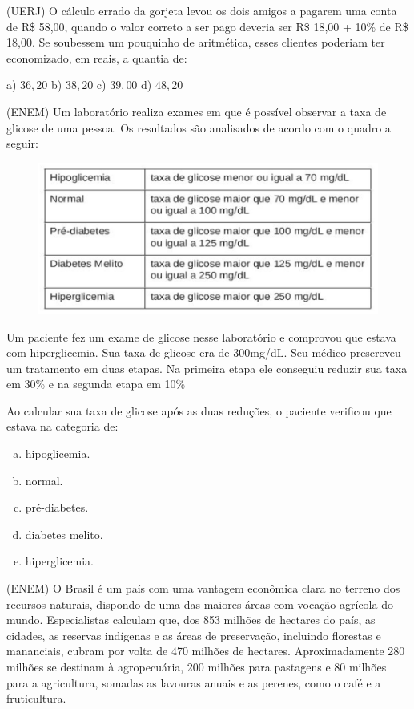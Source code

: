\begin{multicols*}{2}
	\execnum (UERJ) O cálculo errado da gorjeta levou os dois amigos a pagarem uma conta de R\$ 58,00, quando o valor correto a ser pago deveria ser R\$ 18,00 + 10\% de R\$ 18,00. Se soubessem um pouquinho de aritmética, esses clientes
	poderiam ter economizado, em reais, a quantia de:

	a) $36,20 $ b) $38,20 $ c) $39,00 $ d) $48,20 $

	\execnum (ENEM) Um laboratório realiza exames em que é possível observar a taxa de glicose de uma pessoa. Os
	resultados são analisados de acordo com o quadro a seguir:

	\begin{figure}[H]
		\centering
		\includegraphics[width=\columnwidth]{assets/glicemia.png}
	\end{figure}

	Um paciente fez um exame de glicose nesse laboratório e comprovou que estava com hiperglicemia. Sua taxa de
	glicose era de 300mg/dL. Seu médico prescreveu um tratamento em duas etapas. Na primeira etapa ele
	conseguiu reduzir sua taxa em 30\% e na segunda etapa em 10\%

	Ao calcular sua taxa de glicose após as duas reduções, o paciente verificou que estava na categoria de:
	\begin{enumerate}[(a)]
		\item hipoglicemia.
		\item normal.
		\item pré-diabetes.
		\item diabetes melito.
		\item hiperglicemia.
	\end{enumerate}


	\execnum (ENEM) O Brasil é um país com uma vantagem econômica clara no terreno dos recursos naturais, dispondo de uma das maiores áreas com vocação agrícola do mundo. Especialistas calculam que, dos 853 milhões de hectares do país, as cidades, as reservas indígenas e as áreas de preservação, incluindo florestas e mananciais, cubram por volta de 470 milhões de hectares. Aproximadamente 280 milhões se destinam à agropecuária, 200 milhões para pastagens e 80 milhões para a agricultura, somadas as lavouras anuais e as perenes, como o café e a fruticultura.


\end{multicols*}
